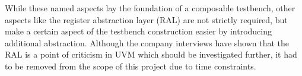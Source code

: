 While these named aspects lay the foundation of a composable testbench, other aspects like the register abstraction layer (RAL) are not strictly required, but make a certain aspect of the testbench construction easier by introducing additional abstraction. Although the company interviews have shown that the RAL is a point of criticism in UVM which should be investigated further, it had to be removed from the scope of this project due to time constraints.

